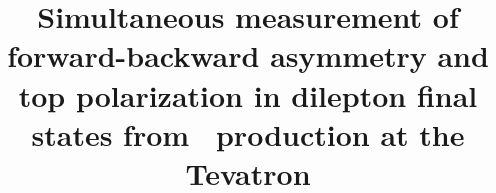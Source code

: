 \documentclass[aps,prd,twocolumn,showpacs,superscriptaddress,groupedaddress,floatfix]{revtex4}
\begin{document}
\def\ddif{ {d}}
\newcommand{\AP}[2]     {\ensuremath{A^{\ell ^{#1}}_{#2}}}
\newcommand{\AAP}[3]     {\ensuremath{A^{\ell ^{#1}{#2} }_{#3}}}
\newcommand{\Polar}[2]     {\ensuremath{P^{#1}_{#2}}}


\newcommand{\defAP}[2]       {\AP{#1}{#2}=\frac{N(\cos\theta^{#1}>0) - N(\cos\theta^{#1}<0)}{N(\cos\theta^{#1}>0) + N(\cos\theta^{#1}<0)}}
\newcommand{\APraw}{\ensuremath{\frac 1 2 \left(\AP{+}{\rm beam, raw} -\AP{-}{\invisible{\rm beam,} raw}\right)}}


\newcommand{\Ptt}{\ensuremath{\kappa\Polar{}{\invisible{\rm beam}}}}
\newcommand{\Praw}{\ensuremath{\kappa\Polar{}{\invisible{\rm beam,} \rm raw}}}
\newcommand{\Pttraw}{\ensuremath{\kappa\Polar{}{\invisible{\rm beam,} \rm raw}}}


\newcommand{\ie}{{\it i.e.}}
\def\eg{{\it e.g.}}



\def\yt {\ensuremath{ y_t}}
\def\ytbar {\ensuremath{ y_{\bar t}}}
\def\dyttbar{\ensuremath{\Delta y_{\ttbar}}}
\def\gev {\ensuremath{\mathrm{GeV}}}
\def\tev {\ensuremath{\mathrm{TeV}}}


\newcommand{\defAtt}{\ensuremath{\Att=   \frac {  N ( \dyttbar>0) -  N ( \dyttbar <0) }{  N ( \dyttbar>0) + N ( \dyttbar <0) }}}





\def \ee{\ensuremath{ee}}
\def \emu{\ensuremath{e\mu}}
\def \mumu{\ensuremath{\mu\mu}}



\newcommand{\lumi}     {$\mathrm{9.7~fb^{-1}}$}
\newcommand{\lumiprev}    {$\mathrm{5.4~fb^{-1}}$}

\newcommand{\doublet}[2]{{\left(\begin{array}{c} #1 \\ {#2} \end{array}\right)}}
\newcommand{\matrixfour}[4]{{\left(\begin{array}{cc} {#1} & {#2}\\ {#3} &{#4} \end{array}\right)}}


 
\title{
Simultaneous measurement of
forward-backward asymmetry and top polarization
in dilepton final states
from \ttbar\ production at the Tevatron
}
\end{document}
